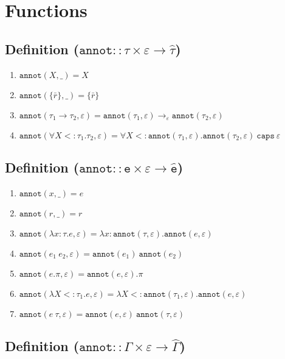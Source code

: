 \documentclass{llncs}
\newcommand{\keywadj}[1]{\mathtt{#1}}
\newcommand{\keyw}[1]{\keywadj{#1}~}
\newcommand{\kw}[1]{\keyw{ #1 }}
\newcommand{\kwa}[1]{\keywadj{ #1 }}
\newcommand{\annot}[2]{
	\keywadj{annot}(#1, #2)
}
\newcommand{\poly}[2]{
	\forall #1. #2
}
\newcommand{\polycap}[3]{
	\forall #1. #2~ \kw{caps} #3
}
\begin{document}
\section{Functions}

\subsection*{Definition ($\kwa{annot :: \tau \times \varepsilon \rightarrow \hat \tau}$)}

\begin{enumerate}
	\item $\annot{X}{\_} = X$
	\item $\annot{\{ \bar r \}}{\_} = \{ \bar r \}$
	\item $\annot{\tau_1 \rightarrow \tau_2}{\varepsilon} = \annot{\tau_1}{\varepsilon} \rightarrow_{\varepsilon} \annot{\tau_2}{\varepsilon}$
	\item $\annot{\poly{X <: \tau_1}{\tau_2}}{\varepsilon} = \polycap{X <: \annot{\tau_1}{\varepsilon}}{\annot{\tau_2}{\varepsilon}}{\varepsilon}$
\end{enumerate}


\subsection*{Definition ($\kwa{annot :: e \times \varepsilon \rightarrow \hat e}$)}

\begin{enumerate}
	\item $\kwa{annot}(x, \_) = e$
	\item $\kwa{annot}(r, \_) = r$
	\item $\kwa{annot}(\lambda x: \tau.e, \varepsilon) = \lambda x: \kwa{annot}(\tau, \varepsilon) . \kwa{annot}(e, \varepsilon)$
	\item $\kwa{annot}(e_1~e_2, \varepsilon) = \kwa{annot}(e_1)~\kwa{annot}(e_2)$
	\item $\kwa{annot}(e.\pi, \varepsilon) = \annot{e}{\varepsilon}.\pi$
	\item $\annot{\lambda X <: \tau_1. e}{\varepsilon} = \lambda X <: \annot{\tau_1}{\varepsilon}. \annot{e}{\varepsilon}$
	\item $\annot{e~\tau}{\varepsilon} = \annot{e}{\varepsilon}~\annot{\tau}{\varepsilon}$
\end{enumerate}

\subsection*{Definition ($\kwa{annot :: \Gamma \times \varepsilon \rightarrow \hat \Gamma}$)}
\end{document}
